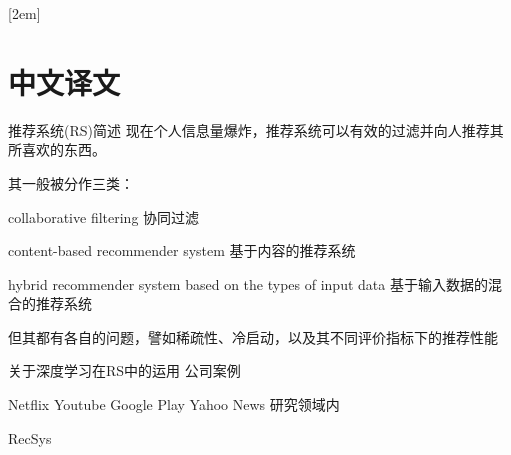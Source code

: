 
[2em]{\vspace{.5\baselineskip}\xiaosan\song}
             {\prechaptername\CJKnumber{\thecontentslabel}\postchaptername\qquad}{}
             {}             %
\setcounter{page}{1}            %
\chapter*{中文译文}


推荐系统(RS)简述
现在个人信息量爆炸，推荐系统可以有效的过滤并向人推荐其所喜欢的东西。

其一般被分作三类：

collaborative filtering 协同过滤

content-based recommender system 基于内容的推荐系统

hybrid recommender system based on the types of input data 基于输入数据的混合的推荐系统

但其都有各自的问题，譬如稀疏性、冷启动，以及其不同评价指标下的推荐性能 

关于深度学习在RS中的运用
公司案例

Netflix
Youtube 
Google Play 
Yahoo News 
研究领域内

RecSys